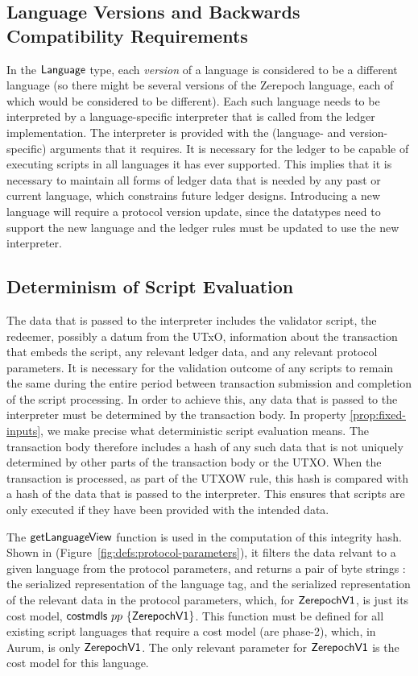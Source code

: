 \subsection{Language Versions and Backwards Compatibility Requirements}
\label{sec:versions}

In the $\mathsf{Language}$ type, each \emph{version} of a language is considered to be a different language (so there might be several versions of the Zerepoch language, each of which would be considered to
be different).
Each such language needs to be interpreted by a language-specific interpreter that is called from the ledger implementation.
The interpreter is provided with the (language- and version-specific) arguments that it requires.
It is necessary for the ledger to be capable of executing scripts in all languages it has ever supported.
This implies that it is necessary to maintain all forms of ledger
data that is needed by any past or current language, which constrains future ledger designs.
Introducing a new language will require a protocol version update, since the datatypes need to support the new language and the ledger rules must be updated to use the new interpreter.

\subsection{Determinism of Script Evaluation}
\label{sec:determinism}

The data that is passed to the interpreter
includes the validator script, the redeemer, possibly a datum from the UTxO, information about the transaction that
embeds the script, any relevant ledger data, and any relevant protocol parameters.
It is necessary for the validation outcome of any scripts to remain the same during the entire
period between transaction
submission and completion of the script processing.
%
In order to achieve this,
any data that is passed to the interpreter must be determined by the transaction body.
In property \ref{prop:fixed-inputs}, we make precise what deterministic script evaluation means.
The transaction body therefore includes a hash of any such data that is not uniquely determined by other parts of the transaction body or the UTXO.
When the transaction is processed, as part of the UTXOW rule, this hash is compared with a hash of the data that is passed to the interpreter. This
ensures that scripts are only executed if they have been provided with the intended data.

The $\mathsf{getLanguageView}$ function is used in the computation of this integrity hash.
Shown in (Figure~\ref{fig:defs:protocol-parameters}), it filters the data relvant
to a given language from the protocol parameters, and returns a pair of byte strings :
the serialized representation of
the language tag, and the serialized representation of the relevant data in the protocol
parameters, which, for
$\mathsf{ZerepochV1}$, is just its cost model, $\mathsf{costmdls}~{pp}~\{\mathsf{ZerepochV1}\}$.
This function must be defined for all
existing script languages that require a cost model (are phase-2), which, in Aurum, is only $\mathsf{ZerepochV1}$.
The only relevant parameter for $\mathsf{ZerepochV1}$ is the cost model for this language.


